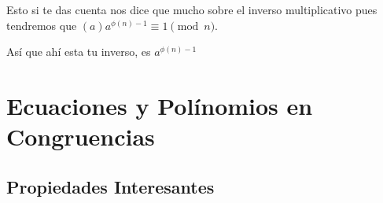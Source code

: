 \documentclass[12pt, fleqn]{report}                             %
\begin{document}
                Esto si te das cuenta nos dice que mucho sobre el inverso multiplicativo
                pues tendremos que $(a)a^{\phi(n)-1} \equiv 1 \pmod{n}$.

                Así que ahí esta tu inverso, es $a^{\phi(n)-1}$




    \clearpage
    \section{Ecuaciones y Polínomios en Congruencias}


        \subsection{Propiedades Interesantes}
\end{document}
